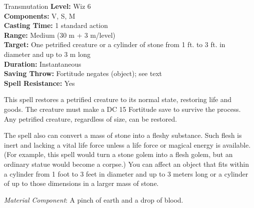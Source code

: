 {Transmutation}
{
	\textbf{Level:}
	Wiz 6\\
	\textbf{Components:}
	V, S, M\\
	\textbf{Casting Time:}
	1 standard action\\
	\textbf{Range:}
	Medium (30 m + 3 m/level)\\
	\textbf{Target:}
	One petrified creature or a cylinder of stone from 1 ft. to 3 ft. in diameter and up to 3 m long\\
	\textbf{Duration:}
	Instantaneous\\
	\textbf{Saving Throw:}
	Fortitude negates (object); see text\\
	\textbf{Spell Resistance:}
	Yes\\
}
{
	This spell restores a petrified creature to its normal state, restoring life and goods. The creature must make a DC 15 Fortitude save to survive the process. Any petrified creature, regardless of size, can be restored.

	The spell also can convert a mass of stone into a fleshy substance. Such flesh is inert and lacking a vital life force unless a life force or magical energy is available. (For example, this spell would turn a stone golem into a flesh golem, but an ordinary statue would become a corpse.) You can affect an object that fits within a cylinder from 1 foot to 3 feet in diameter and up to 3 meters long or a cylinder of up to those dimensions in a larger mass of stone.

	\textit{Material Component}:
	A pinch of earth and a drop of blood.

}
